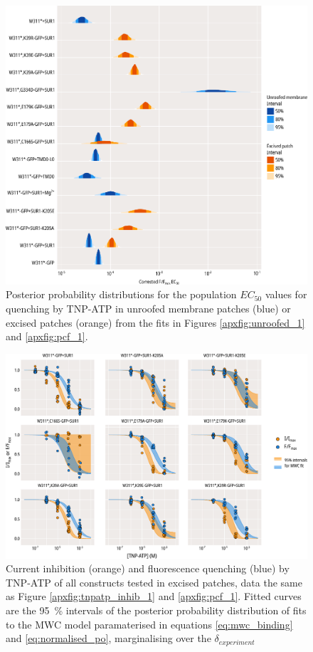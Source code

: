 \begin{figure}[h]
	\centering
	\includegraphics[width=\textwidth]{all_binding_params.pdf}
	\caption[Fluorescence quenching EC\textsubscript{50} posterior distributions]{
	Posterior probability distributions for the population $EC_{50}$ values for quenching by TNP-ATP in unroofed membrane patches (blue) or excised patches (orange) from the fits in Figures \ref{apxfig:unroofed_1} and \ref{apxfig:pcf_1}.
	}
	\label{apxfig:binding_params}
\end{figure}

\begin{figure}[h]
	\centering
	\includegraphics[width=\textwidth]{all_pcf_fits_1.pdf}
	\caption[MWC population fits]{
	Current inhibition (orange) and fluorescence quenching (blue) by TNP-ATP of all constructs tested in excised patches, data the same as Figure \ref{apxfig:tnpatp_inhib_1} and \ref{apxfig:pcf_1}.
	Fitted curves are the \SI{95}{\percent} intervals of the posterior probability distribution of fits to the MWC model paramaterised in equations \ref{eq:mwc_binding} and \ref{eq:normalised_po}, marginalising over the $\delta_{experiment}$
	}
	\label{apxfig:pcf_3}
\end{figure}

